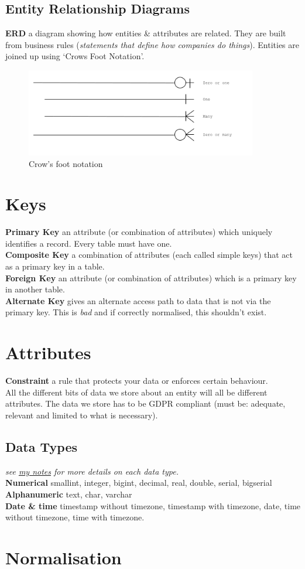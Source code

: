 \documentclass[a4paper,11pt]{article}
\begin{document}
\subsection{Entity Relationship Diagrams}
\textbf{ERD} a diagram showing how entities \& attributes are related. They are built from business rules (\textit{statements that define how companies do things}). Entities are joined up using `Crows Foot Notation'.
\begin{figure}[H]
    \centering
    \includegraphics[width=0.9\textwidth]{../assets/relationship-links.png}
    \caption{Crow's foot notation}
\end{figure}

\section{Keys}
\textbf{Primary Key} an attribute (or combination of attributes) which uniquely identifies a record. Every table must have one.\\
\textbf{Composite Key} a combination of attributes (each called simple keys) that act as a primary key in a table.\\
\textbf{Foreign Key} an attribute (or combination of attributes) which is a primary key in another table.\\
\textbf{Alternate Key} gives an alternate access path to data that is not via the primary key. This is \textit{bad} and if correctly normalised, this shouldn't exist. 

\section{Attributes}
\textbf{Constraint} a rule that protects your data or enforces certain behaviour.\\
All the different bits of data we store about an entity will all be different attributes. The data we store has to be GDPR compliant (must be: adequate, relevant and limited to what is necessary).
\subsection{Data Types}
\textit{see \href{https://thomasboxall.github.io/uni-notes/01-FIRST-YEAR/M30232-databaseSystemsDevelopment/M30232.pdf}{my notes} for more details on each data type.}\\
\textbf{Numerical} smallint, integer, bigint, decimal, real, double, serial, bigserial\\
\textbf{Alphanumeric} text, char, varchar\\
\textbf{Date \& time} timestamp without timezone, timestamp with timezone, date, time without timezone, time with timezone.

\section{Normalisation}
\end{document}
